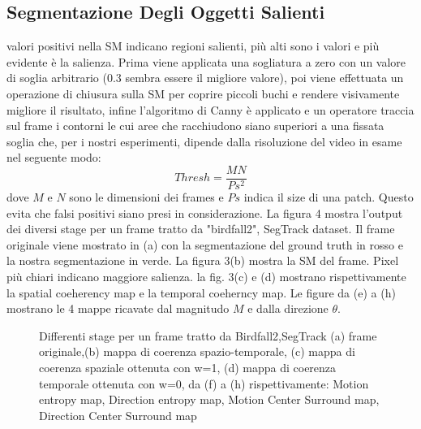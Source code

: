 \documentclass[12pt,twocolumn]{IEEEtran}
\begin{document}
		\subsection{Segmentazione Degli Oggetti Salienti}
			valori positivi nella SM indicano regioni salienti, più alti sono i valori e più evidente è la salienza. Prima viene applicata una sogliatura a zero con un valore di soglia arbitrario (0.3 sembra essere il migliore valore), poi viene effettuata un operazione di chiusura sulla SM per coprire piccoli buchi e rendere visivamente migliore il risultato, infine l'algoritmo di Canny è applicato e un operatore traccia sul frame i contorni le cui aree che racchiudono siano superiori a una fissata soglia che, per i nostri esperimenti, dipende dalla risoluzione del video in esame nel seguente modo:
			\begin{equation}
			 Thresh = \frac{MN}{Ps^2}
			\end{equation}
			dove $M$ e $N$ sono le dimensioni dei frames e $Ps$ indica il size di una patch. Questo evita che falsi positivi siano presi in considerazione.\newline
			La figura 4 mostra l'output dei diversi stage per un frame tratto da "birdfall2", SegTrack dataset. Il frame originale viene mostrato in (a) con la segmentazione del ground truth in rosso e la nostra segmentazione in verde. La figura 3(b) mostra la SM del frame. Pixel più chiari indicano maggiore salienza. la fig. 3(c) e (d) mostrano rispettivamente  la spatial coeherency map e la temporal coeherncy map. Le figure da (e) a (h) mostrano le 4 mappe ricavate dal magnitudo $M$ e dalla direzione $\theta$.
			\pagebreak
			\begin{figure*}[ht]
			\caption{Differenti stage per un frame tratto da Birdfall2,SegTrack
			(a) frame originale,(b) mappa di coerenza spazio-temporale, (c) mappa di coerenza spaziale ottenuta con w=1, (d) mappa di coerenza temporale ottenuta con w=0, da (f) a (h) rispettivamente: Motion entropy map, Direction entropy map, Motion Center Surround map, Direction Center Surround map}
			\begin{center}
				\hspace*{.2cm}
				\hspace*{.2cm}
				\hspace*{.2cm}
			\end{center}
			\begin{center}
				\hspace*{.2cm}
				\hspace*{.2cm}
				\hspace*{.2cm}
			\end{center}
			\end{figure*}
\end{document}
